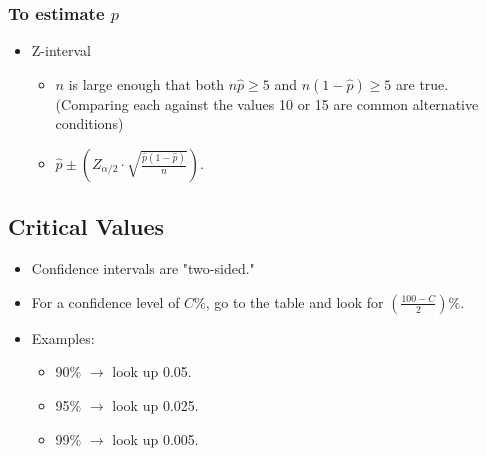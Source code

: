 \documentclass{report}
\begin{document}
\subsubsection*{To estimate $p$}
\begin{itemize}
    \item Z-interval
    \begin{itemize}
        \item $n$ is large enough that both $n\hat{p} \geq 5$ and $n(1 - \hat{p}) \geq 5$ are true. (Comparing each against the values 10 or 15 are common alternative conditions)
        \item $\hat{p} \pm \left(Z_{\alpha/2} \cdot \sqrt{\frac{\hat{p}(1-\hat{p})}{n}}\right)$.
    \end{itemize}
\end{itemize}

\subsection*{Critical Values}
\begin{itemize}
    \item Confidence intervals are "two-sided."
    \item For a confidence level of $C\%$, go to the table and look for $\left(\frac{100 - C}{2}\right)\%$.
    \item Examples:
    \begin{itemize}
        \item 90\% $\rightarrow$ look up 0.05.
        \item 95\% $\rightarrow$ look up 0.025.
        \item 99\% $\rightarrow$ look up 0.005.
    \end{itemize}
\end{itemize}
\end{document}
